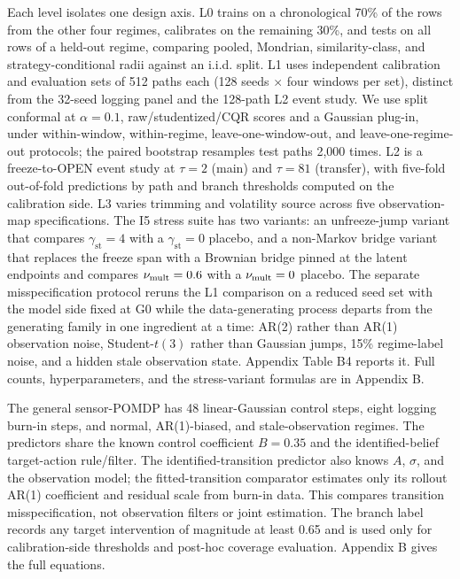 Each level isolates one design axis. L0 trains on a chronological 70\% of the rows from the other four regimes, calibrates on the remaining 30\%, and tests on all rows of a held-out regime, comparing pooled, Mondrian, similarity-class, and strategy-conditional radii against an i.i.d. split. L1 uses independent calibration and evaluation sets of 512 paths each (128 seeds $\times$ four windows per set), distinct from the 32-seed logging panel and the 128-path L2 event study. We use split conformal at $\alpha=0.1$, raw/studentized/CQR scores and a Gaussian plug-in, under within-window, within-regime, leave-one-window-out, and leave-one-regime-out protocols; the paired bootstrap resamples test paths 2,000 times. L2 is a freeze-to-OPEN event study at $\tau=2$ (main) and $\tau=81$ (transfer), with five-fold out-of-fold predictions by path and branch thresholds computed on the calibration side. L3 varies trimming and volatility source across five observation-map specifications. The I5 stress suite has two variants: an unfreeze-jump variant that compares $\gamma_{\mathrm{st}}=4$ with a $\gamma_{\mathrm{st}}=0$ placebo, and a non-Markov bridge variant that replaces the freeze span with a Brownian bridge pinned at the latent endpoints and compares $\nu_{\rm mult}=0.6$ with a $\nu_{\rm mult}=0$ placebo. The separate misspecification protocol reruns the L1 comparison on a reduced seed set with the model side fixed at G0 while the data-generating process departs from the generating family in one ingredient at a time: AR(2) rather than AR(1) observation noise, Student-$t(3)$ rather than Gaussian jumps, 15\% regime-label noise, and a hidden stale observation state. Appendix Table B4 reports it. Full counts, hyperparameters, and the stress-variant formulas are in Appendix B.

The general sensor-POMDP has 48 linear-Gaussian control steps, eight logging burn-in steps, and normal, AR(1)-biased, and stale-observation regimes. The predictors share the known control coefficient $B=0.35$ and the identified-belief target-action rule/filter. The identified-transition predictor also knows $A$, $\sigma$, and the observation model; the fitted-transition comparator estimates only its rollout AR(1) coefficient and residual scale from burn-in data. This compares transition misspecification, not observation filters or joint estimation. The branch label records any target intervention of magnitude at least 0.65 and is used only for calibration-side thresholds and post-hoc coverage evaluation. Appendix B gives the full equations.


